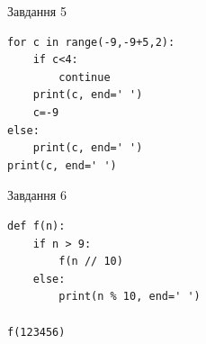 \documentclass[12pt, ukrainian]{article}
\begin{document}
{\vspace{15mm}
\begin{minipage}[t]{9.7cm}                
{\begin{center}Завдання {5}\end{center}}
\begin{verbatim}
for c in range(-9,-9+5,2):
    if c<4:
        continue
    print(c, end=' ')
    c=-9
else:
    print(c, end=' ')
print(c, end=' ')
\end{verbatim}     
\end{minipage}
\vline \hspace{8mm}
\begin{minipage}[t]{8.0cm}                
{\begin{center}Завдання {6}\end{center}}
\begin{verbatim}
def f(n):
    if n > 9:
        f(n // 10)
    else:
        print(n % 10, end=' ')

f(123456)
\end{verbatim}     
\end{minipage}

}
\newpage
\end{document}
